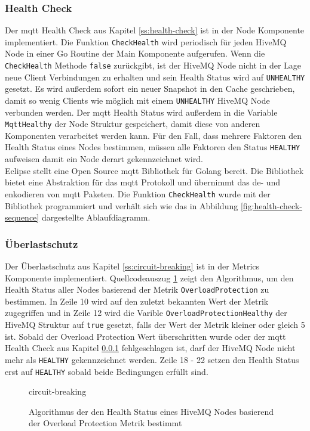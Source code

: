\subsubsection{Health Check} \label{si:health-check}
Der \ac{mqtt} Health Check aus Kapitel \ref{ss:health-check} ist in der Node Komponente implementiert. Die Funktion \verb|CheckHealth| wird periodisch für jeden HiveMQ Node in einer Go Routine der Main Komponente aufgerufen. Wenn die \verb|CheckHealth| Methode \verb|false| zurückgibt, ist der HiveMQ Node nicht in der Lage neue Client Verbindungen zu erhalten und sein Health Status wird auf \verb|UNHEALTHY| gesetzt. Es wird au{\ss}erdem sofort ein neuer Snapshot in den Cache geschrieben, damit so wenig Clients wie möglich mit einem \verb|UNHEALTHY| HiveMQ Node verbunden werden. Der \ac{mqtt} Health Status wird au{\ss}erdem in die Variable \verb|MqttHealthy| der Node Struktur gespeichert, damit diese von anderen Komponenten verarbeitet werden kann. Für den Fall, dass mehrere Faktoren den Health Status eines Nodes bestimmen, müssen alle Faktoren den Status \verb|HEALTHY| aufweisen damit ein Node derart gekennzeichnet wird.
\\
Eclipse stellt eine Open Source \ac{mqtt} Bibliothek für Golang bereit.
\cite{EclipsePahoMqtt2021}
Die Bibliothek bietet eine Abstraktion für das \ac{mqtt} Protokoll und übernimmt das de- und enkodieren von \ac{mqtt} Paketen. Die Funktion \verb|CheckHealth| wurde mit der Bibliothek programmiert und verhält sich wie das in Abbildung \ref{fig:health-check-sequence} dargestellte Ablaufdiagramm.

\subsubsection{Überlastschutz}
Der Überlastschutz aus Kapitel \ref{ss:circuit-breaking} ist in der Metrics Komponente implementiert. Quellcodeauszug \ref{code:circuit-breaking} zeigt den Algorithmus, um den Health Status aller Nodes basierend der Metrik \verb|OverloadProtection| zu bestimmen. In Zeile 10 wird auf den zuletzt bekannten Wert der Metrik zugegriffen und in Zeile 12 wird die Varible \verb|OverloadProtectionHealthy| der HiveMQ Struktur auf \verb|true| gesetzt, falls der Wert der Metrik kleiner oder gleich 5 ist.
Sobald der Overload Protection Wert überschritten wurde oder der \ac{mqtt} Health Check aus Kapitel \ref{si:health-check} fehlgeschlagen ist, darf der HiveMQ Node nicht mehr als \verb|HEALTHY| gekennzeichnet werden. Zeile 18 - 22 setzen den Health Status erst auf \verb|HEALTHY| sobald beide Bedingungen erfüllt sind.
\begin{figure}
    {circuit-breaking}
    \caption{Algorithmus der den Health Status eines HiveMQ Nodes basierend der Overload Protection Metrik bestimmt}
    \label{code:circuit-breaking}
\end{figure}
\newpage

